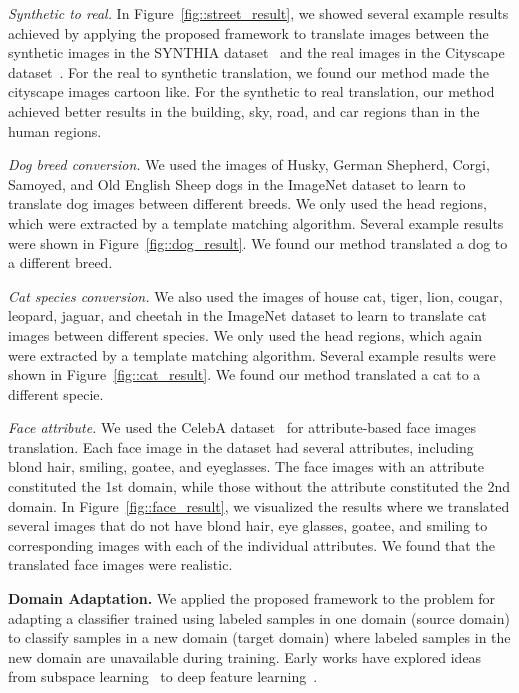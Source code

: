 \documentclass{article}
\begin{document}
{\it Synthetic to real.} In Figure~\ref{fig::street_result}, we showed several example results achieved by applying the proposed framework to translate images between the synthetic images in the SYNTHIA dataset~\cite{RosCVPR16} and the real images in the Cityscape dataset~\cite{cordts2015cityscapes}. For the real to synthetic translation, we found our method made the cityscape images cartoon like. For the synthetic to real translation, our method achieved better results in the building, sky, road, and car regions than in the human regions. 

{\it Dog breed conversion.} We used the images of Husky, German Shepherd, Corgi, Samoyed, and Old English Sheep dogs in the ImageNet dataset to learn to translate dog images between different breeds. We only used the head regions, which were extracted by a template matching algorithm. Several example results were shown in Figure~\ref{fig::dog_result}. We found our method translated a dog to a different breed. 

{\it Cat species conversion.} We also used the images of house cat, tiger, lion, cougar, leopard, jaguar, and cheetah in the ImageNet dataset to learn to translate cat images between different species. We only used the head regions, which again were extracted by a template matching algorithm. Several example results were shown in Figure~\ref{fig::cat_result}. We found our method translated a cat to a different specie.

{\it Face attribute.} We used the CelebA dataset~\cite{liu2015deep} for attribute-based face images translation. Each face image in the dataset had several attributes, including blond hair, smiling, goatee, and eyeglasses. The face images with an attribute constituted the 1st domain, while those without the attribute constituted the 2nd domain. In Figure~\ref{fig::face_result}, we visualized the results where we translated several images that do not have blond hair, eye glasses, goatee, and smiling to corresponding images with each of the individual attributes. We found that the translated face images were realistic.

{\bf Domain Adaptation.} We applied the proposed framework to the problem for adapting a classifier trained using labeled samples in one domain (source domain) to classify samples in a new domain (target domain) where labeled samples in the new domain are unavailable during training. Early works have explored ideas from subspace learning~\cite{fernando2013unsupervised} to deep feature learning~\cite{ganin2016domain,liu2016coupled,taigman2016unsupervised}. 
\end{document}
